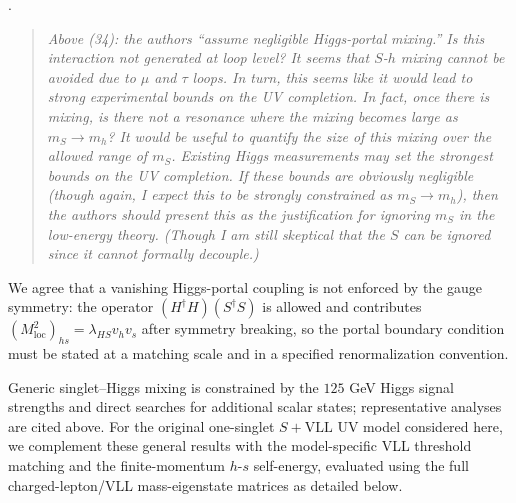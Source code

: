 \documentclass[12pt,a4paper]{article}
\begin{document}
\medskip
{}. \begin{quote}\itshape
Above (34): the authors ``assume negligible Higgs-portal mixing.'' Is this interaction not generated at loop level? It seems that \(S\)-\(h\) mixing cannot be avoided due to \(\mu\) and \(\tau\) loops. In turn, this seems like it would lead to strong experimental bounds on the UV completion. In fact, once there is mixing, is there not a resonance where the mixing becomes large as \(m_S\to m_h\)? It would be useful to quantify the size of this mixing over the allowed range of \(m_S\). Existing Higgs measurements may set the strongest bounds on the UV completion. If these bounds are obviously negligible (though again, I expect this to be strongly constrained as \(m_S\to m_h\)), then the authors should present this as the justification for ignoring \(m_S\) in the low-energy theory. (Though I am still skeptical that the \(S\) can be ignored since it cannot formally decouple.)\end{quote}

We agree that a vanishing Higgs-portal coupling is not enforced by the gauge symmetry: the operator \((H^\dagger H)(S^\dagger S)\) is allowed and contributes \((M_{\mathrm{loc}}^2)_{hs}=\lambda_{HS}v_hv_s\) after symmetry breaking, so the portal boundary condition must be stated at a matching scale and in a specified renormalization convention.

Generic singlet--Higgs mixing is constrained by the \(125\) GeV Higgs signal strengths and direct searches for additional scalar states; representative analyses are cited above. For the original one-singlet \(S+\mathrm{VLL}\) UV model considered here, we complement these general results with the model-specific VLL threshold matching and the finite-momentum \(h\)-\(s\) self-energy, evaluated using the full charged-lepton/VLL mass-eigenstate matrices as detailed below.
\end{document}
